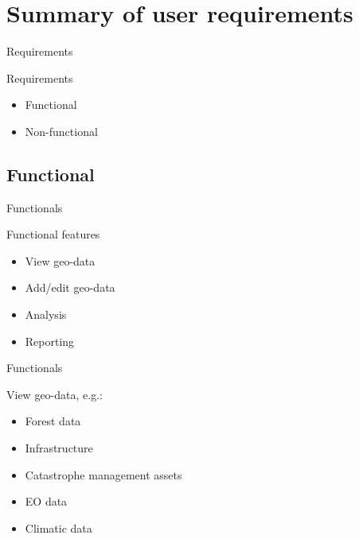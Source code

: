 \section{Summary of user requirements}

\begin{frame}{Requirements}
	\begin{block}{Requirements}
		\begin{itemize}
			\item Functional
			\item Non-functional
		\end{itemize}
	\end{block}
	
\end{frame}

\subsection{Functional}
\begin{frame}{Functionals}
\begin{block}{Functional features}
	    \begin{itemize}
	    \item View geo-data
	    \item Add/edit geo-data
	    \item Analysis
	    \item Reporting
	    \end{itemize}
\end{block}
 
\end{frame}


\begin{frame}{Functionals}
\begin{block}{View geo-data, e.g.:}
    \begin{itemize}
	    \item Forest data
        \item Infrastructure
        \item Catastrophe management assets
        \item EO data
        \item Climatic data
    \end{itemize}
\end{block}
 
\end{frame}


